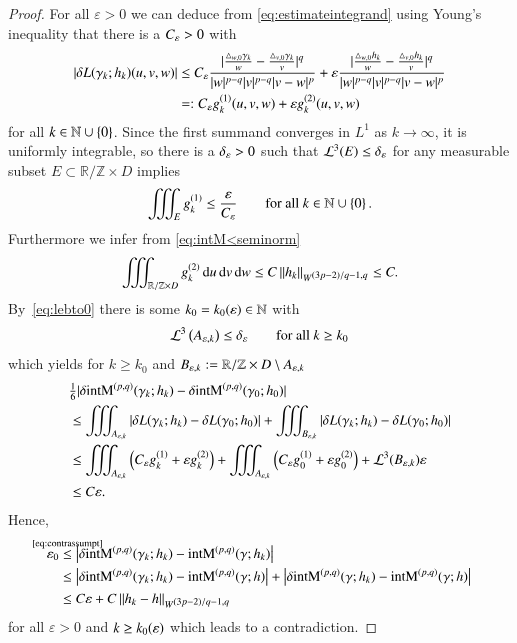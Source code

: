 \begin{proof}
For all $\varepsilon >0$ we can deduce from \eqref{eq:estimateintegrand}
using Young's inequality that there is a $C_{\eps}>0$ with
\begin{equation}
\begin{split}
 \left|\delta L(\gamma_{k};h_{k})(u,v,w) \right|
 &\leq   C_\varepsilon  \frac{|\frac {\T[\g_k] w0} w - \frac {\T[\g_k] v0} v|^q }{|w|^{p-q} |v|^{p-q} |v-w|^p} 
  + \varepsilon \frac { |\frac {\T[h_{k}] w0} w - \frac {\T[h_{k}] v0} v|^q}{|w|^{p-q} |v|^{p-q} |v-w|^p} 
  \\ &=: C_{\eps}g^{(1)}_k(u,v,w) + \varepsilon g^{(2)}_k(u,v,w)
 \end{split} 
\end{equation}
for all $k\in\N\cup\set0$.
Since the first summand converges in $L^1$ as $k\to\infty$, it is uniformly integrable,
so %
there is a $\delta_\eps >0$ such that
$\mathcal L^{3} (E) \leq \delta_\eps$ for any measurable subset $E \subset \mathbb R / \mathbb Z \times D$ implies
\begin{equation}
 \iiint_E g_k^{(1)}  \leq \frac\eps{C_{\eps}} \qquad\text{for all }k\in\N\cup\set0.
\end{equation}
Furthermore we infer from \eqref{eq:intM<seminorm}
\begin{equation*}
 \iiint_{\mathbb R / \mathbb Z \times D} g^{(2)}_k \d u\d v\d w \leq C \norm {h_{k}}_{\W} \leq C.
\end{equation*}
By~\eqref{eq:lebto0} there is some $k_0=k_{0}(\eps) \in \mathbb N$ with
\begin{equation*}
 \mathcal L^3 \br{A_{\eps,k}} \leq \delta_\eps
 \qquad\text{for all } k \geq k_0
\end{equation*}
which yields for
$k \geq k_0$ and
$B_{\eps,k} := \mathbb R / \mathbb Z \times D \setminus A_{\eps,k}$
\begin{align*}
 &\tfrac16|\delta \E(\g_k; h_k) - \delta\E (\gamma_{0};h_{0})| \\
 &\leq \iiint_{A_{\eps,k}} |\delta L(\g_k;h_k)-\delta L(\g_0;h_0) |
  + \iiint_{B_{\eps,k}} |\delta L(\g_k;h_k)-\delta L(\g_0;h_0) | \\
 & \leq \iiint_{A_{\eps,k}} \left(C_{\eps} g^{(1)}_k +  \varepsilon g^{(2)}_k \right)
 + \iiint_{A_{\eps,k}} \left(C_{\eps} g_{0}^{(1)} +  \varepsilon g_{0}^{(2)} \right)
 + \mathcal L^3(B_{\eps,k}) \varepsilon \\
 & %
  \leq C\eps.
\end{align*}
Hence,
\begin{align*}
 \eps_{0}&\refeq[\le]{contrassumpt}\abs{\delta \E(\g_k; h_k) - \E (\gamma;h_k)} \\
 &\le \abs{\delta \E(\g_k; h_k) - \E (\gamma;h)} + \abs{\delta \E(\g; h_k) - \E (\gamma;h)} \\
 &\le C\eps + C\norm{h_{k}-h}_{\W}
\end{align*}
for all $\varepsilon >0$ and $k\ge k_{0}(\eps)$ which leads to a contradiction.
\end{proof}


